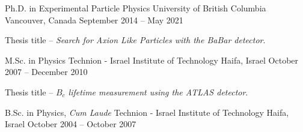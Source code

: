 
\begin{cventries}

  \cventry
    {Ph.D. in Experimental Particle Physics} %
    {University of British Columbia} %
    {Vancouver, Canada} %
    {September 2014 -- May 2021} %
    {
      \begin{cvitems} %
        \item {Thesis title -- \emph{Search for Axion Like Particles with the BaBar detector}.}
      \end{cvitems}
    }

    \cventry
    {M.Sc. in Physics} %
    {Technion - Israel Institute of Technology} %
    {Haifa, Israel} %
    {October 2007 -- December 2010} %
    {
      \begin{cvitems} %
        \item {Thesis title -- \emph{$B_c$ lifetime measurement using the ATLAS detector}.}
      \end{cvitems}
    }

  \cventry
    {B.Sc. in Physics, \emph{Cum Laude}} %
    {Technion - Israel Institute of Technology} %
    {Haifa, Israel} %
    {October 2004 -- October 2007} %
    {}
    \vspace{-4mm}
\end{cventries}
